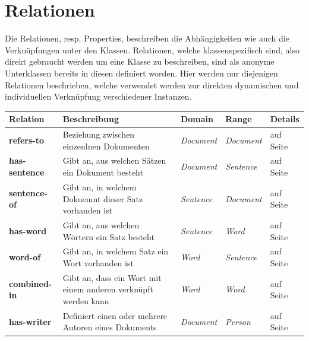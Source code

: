 \documentclass[
    11pt,
    latin1,
    a4paper,
    oneside
]{scrreprt}
\begin{document}

\section{Relationen} \label{sec:reltations}

Die Relationen, resp. Properties, beschreiben die Abh\"angigkeiten wie auch die Verkn\"upfungen unter den Klassen. Relationen, welche klassenspezifisch sind, also direkt gebraucht werden um eine Klasse zu beschreiben, sind als anonyme Unterklassen bereits in diesen definiert worden. Hier werden nur diejenigen Relationen beschrieben, welche verwendet werden zur direkten dynamischen und individuellen Verkn\"upfung verschiedener Instanzen.

\begin{table}[H]
  \centering
  \begin{tabular}{ | l | p{4cm} | p{3cm} | p{2cm} | p{2cm} | }
    \hline
    \textbf{Relation} & \textbf{Beschreibung} & \textbf{Domain} & \textbf{Range} & \textbf{Details} \\ \hline
    \textbf{refers-to} & Beziehung zwischen einzenlnen Dokumenten & \emph{Document} & \emph{Document} & \nameref{sec:rel_refersto} auf Seite \pageref{sec:rel_refersto} \\ \hline
    \textbf{has-sentence} & Gibt an, aus welchen S\"atzen ein Dokument besteht & \emph{Document} & \emph{Sentence} & \nameref{sec:rel_hassentence} auf Seite \pageref{sec:rel_hassentence} \\ \hline
    \textbf{sentence-of} & Gibt an, in welchem Dokuemnt dieser Satz vorhanden ist & \emph{Sentence} & \emph{Document} & \nameref{sec:rel_sentenceof} auf Seite \pageref{sec:rel_sentenceof} \\ \hline
    \textbf{has-word} & Gibt an, aus welchen W\"ortern ein Satz besteht & \emph{Sentence} & \emph{Word} & \nameref{sec:rel_hasword} auf Seite \pageref{sec:rel_hasword} \\ \hline
    \textbf{word-of} & Gibt an, in welchem Satz ein Wort vorhanden ist & \emph{Word} & \emph{Sentence} & \nameref{sec:rel_wordof} auf Seite \pageref{sec:rel_wordof} \\ \hline
    \textbf{combined-in} & Gibt an, dass ein Wort mit einem anderen verkn\"upft werden kann & \emph{Word} & \emph{Word} & \nameref{sec:rel_wordcombo} auf Seite \pageref{sec:rel_wordcombo} \\ \hline
    \textbf{has-writer} & Definiert einen oder mehrere Autoren eines Dokuments & \emph{Document} & \emph{Person} & \nameref{sec:rel_haswriter} auf Seite \pageref{sec:rel_haswriter} \\ \hline

\end{tabular}
\end{table}
\end{document}
